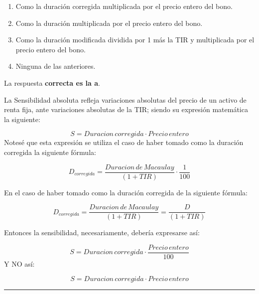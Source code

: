 \documentclass[
  letterpaper,
  DIV=11,
  numbers=noendperiod]{scrreprt}
\begin{document}
\begin{enumerate}
\def\labelenumi{\alph{enumi}.}
\item
  Como la duración corregida multiplicada por el precio entero del bono.
\item
  Como la duración multiplicada por el precio entero del bono.
\item
  Como la duración modificada dividida por 1 más la TIR y multiplicada
  por el precio entero del bono.
\item
  Ninguna de las anteriores.
\end{enumerate}

\begin{tcolorbox}[enhanced jigsaw, left=2mm, opacityback=0, colback=white, breakable, arc=.35mm, bottomrule=.15mm, rightrule=.15mm, toprule=.15mm, leftrule=.75mm, colframe=quarto-callout-tip-color-frame]
\begin{minipage}[t]{5.5mm}
\textcolor{quarto-callout-tip-color}{\faLightbulb}
\end{minipage}%
\begin{minipage}[t]{\textwidth - 5.5mm}

La respuesta \textbf{correcta es la a}.

La Sensibilidad absoluta refleja variaciones absolutas del precio de un
activo de renta fija, ante variaciones absolutas de la TIR; siendo su
expresión matemática la siguiente:

\[S={Duracion\,corregida }\cdot{Precio\,entero}\] Notesé que esta
expresión se utiliza el caso de haber tomado como la duración corregida
la siguiente fórmula:

\[D_{corregida}=\frac{Duracion\,de\, Macaulay}{\left(1+TIR\right)}\cdot\frac{1}{100}\]

En el caso de haber tomado como la duración corregida de la siguiente
fórmula:

\[D_{corregida}=\frac{Duracion\,de\, Macaulay}{\left(1+TIR\right)}=\frac{D}{\left(1+TIR\right)} \]

Entonces la sensibilidad, necesariamente, debería expresarse así:

\[S= Duracion\,corregida \cdot \frac{Precio\,entero}{100}\] Y NO así:

\[S={Duracion\,corregida }\cdot{Precio\,entero}\]

\end{minipage}%
\end{tcolorbox}

\begin{center}\rule{0.5\linewidth}{0.5pt}\end{center}
\end{document}
